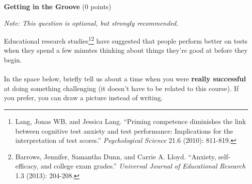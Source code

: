 \documentclass[12pt]{article}
\newenvironment{question}[2][Question]{\begin{trivlist}
\item[\hskip \labelsep {\bfseries #1}\hskip \labelsep {\bfseries #2.}]}{\end{trivlist}}
\begin{document}
\clearpage
\begin{question}{0}\textbf{Getting in the Groove} (0 points)
\begin{center}
\textit{Note: This question is optional, but strongly recommended.}
\end{center}
Educational research studies\footnote{\scriptsize{Lang, Jonas WB, and Jessica Lang. ``Priming competence diminishes the link between cognitive test anxiety and test performance: Implications for the interpretation of test scores.'' \textit{Psychological Science} 21.6 (2010): 811-819.}}\footnote{\scriptsize{Barrows, Jennifer, Samantha Dunn, and Carrie A. Lloyd. ``Anxiety, self-efficacy, and college exam grades.'' \textit{Universal Journal of Educational Research} 1.3 (2013): 204-208.}} have suggested that people perform better on tests when they spend a few minutes thinking about things they're good at before they begin.\\\\
In the space below, briefly tell us about a time when you were \textbf{really successful} at doing something challenging (it doesn't have to be related to this course). If you prefer, you can draw a picture instead of writing.\\
\vfill
\hfill
\end{question}
\end{document}
